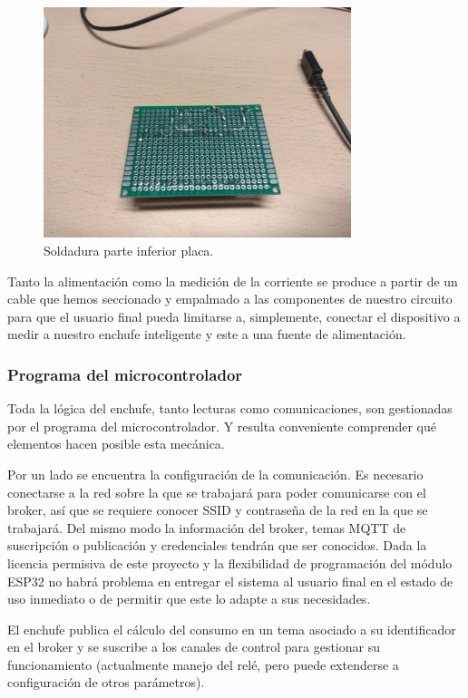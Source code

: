 \documentclass[a4paper,10pt]{article}
\begin{document}
\begin{figure}
  \centering
  \includegraphics[width=0.8\textwidth]{img/soldadura_inferior.jpg}
  \caption{Soldadura parte inferior placa.}\label{fig:soldado_inferior}
\end{figure}

Tanto la alimentación como la medición de la corriente se produce a
partir de un cable que hemos seccionado y empalmado a las componentes
de nuestro circuito para que el usuario final pueda limitarse a,
simplemente, conectar el dispositivo a medir a nuestro enchufe
inteligente y este a una fuente de alimentación.

\subsubsection{Programa del microcontrolador}

Toda la lógica del enchufe, tanto lecturas como comunicaciones, son
gestionadas por el programa del microcontrolador. Y resulta conveniente
comprender qué elementos hacen posible esta mecánica.

Por un lado se encuentra la configuración de la comunicación. Es
necesario conectarse a la red sobre la que se trabajará para poder
comunicarse con el broker, así que se requiere conocer SSID y
contraseña de la red en la que se trabajará. Del mismo modo la
información del broker, temas MQTT de suscripción o publicación y
credenciales tendrán que ser conocidos. Dada la licencia permisiva de
este proyecto y la flexibilidad de programación del módulo ESP32 no
habrá problema en entregar el sistema al usuario final en el estado de
uso inmediato o de permitir que este lo adapte a sus necesidades.

El enchufe publica el cálculo del consumo en un tema asociado a su
identificador en el broker y se suscribe a los canales de control para
gestionar su funcionamiento (actualmente manejo del relé, pero puede
extenderse a configuración de otros parámetros).
\end{document}
